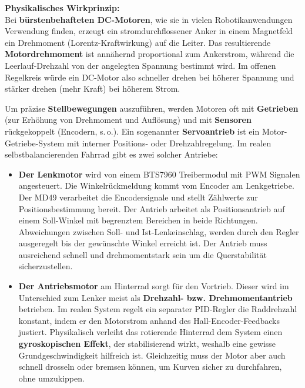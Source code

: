   \textbf{Physikalisches Wirkprinzip:} \\
  Bei \textbf{bürstenbehafteten DC-Motoren}, wie sie in vielen Robotikanwendungen Verwendung finden, 
  erzeugt ein stromdurchflossener Anker in einem Magnetfeld ein Drehmoment 
  (Lorentz-Kraftwirkung) auf die Leiter. 
  Das resultierende \textbf{Motordrehmoment} ist annähernd proportional zum Ankerstrom, 
  während die Leerlauf-Drehzahl von der angelegten Spannung bestimmt wird. 
  Im offenen Regelkreis würde ein DC-Motor also schneller drehen bei höherer Spannung 
  und stärker drehen (mehr Kraft) bei höherem Strom. 

  Um präzise \textbf{Stellbewegungen} auszuführen, werden Motoren oft mit \textbf{Getrieben} 
  (zur Erhöhung von Drehmoment und Auflösung) und mit \textbf{Sensoren} rückgekoppelt (Encodern, s.\,o.). 
  Ein sogenannter \textbf{Servoantrieb} ist ein Motor-Getriebe-System mit interner Positions- oder Drehzahlregelung. 
  Im realen selbstbalancierenden Fahrrad gibt es zwei solcher Antriebe:
    
  \begin{itemize}
    \item \textbf{Der Lenkmotor} wird von einem BTS7960 Treibermodul mit PWM Signalen angesteuert. 
    Die Winkelrückmeldung kommt vom Encoder am Lenkgetriebe. 
    Der MD49 verarbeitet die Encodersignale und stellt Zählwerte zur Positionsbestimmung bereit. 
    Der Antrieb arbeitet als Positionsantrieb auf einem Soll-Winkel mit begrenztem Bereichen in beide Richtungen. 
    Abweichungen zwischen Soll- und Ist-Lenkeinschlag, werden durch den Regler ausgeregelt bis der gewünschte Winkel erreicht ist. 
    Der Antrieb muss ausreichend schnell und drehmomentstark sein um die Querstabilität sicherzustellen.
  
  
    \item \textbf{Der Antriebsmotor} am Hinterrad sorgt für den Vortrieb. 
    Dieser wird im Unterschied zum Lenker meist als \textbf{Drehzahl- bzw. Drehmomentantrieb} betrieben. 
    Im realen System regelt ein separater PID-Regler die Raddrehzahl konstant, indem er den Motorstrom anhand des Hall-Encoder-Feedbacks justiert. 
    Physikalisch verleiht das rotierende Hinterrad dem System einen \textbf{gyroskopischen Effekt}, 
    der stabilisierend wirkt, weshalb eine gewisse Grundgeschwindigkeit hilfreich ist. 
    Gleichzeitig muss der Motor aber auch schnell drosseln oder bremsen können, um Kurven sicher zu durchfahren, ohne umzukippen.
  \end{itemize}

